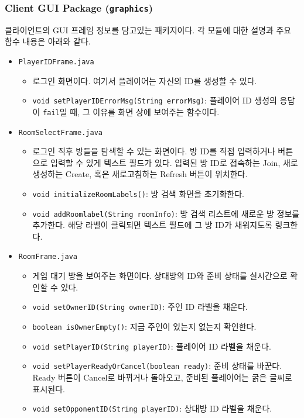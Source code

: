 \documentclass[a4paper, 10pt]{article}
\begin{document}
\subsubsection{Client GUI Package (\texttt{graphics})}
클라이언트의 GUI 프레임 정보를 담고있는 패키지이다. 각 모듈에 대한 설명과 주요
함수 내용은 아래와 같다.
\begin{itemize}
  \item \texttt{PlayerIDFrame.java}
  \begin{itemize}
    \item[] 로그인 화면이다. 여기서 플레이어는 자신의 ID를 생성할 수 있다.
    \item \texttt{void setPlayerIDErrorMsg(String errorMsg)}: 플레이어 ID 생성의 응답이 \texttt{fail}일 때, 그 이유를
    화면 상에 보여주는 함수이다.
  \end{itemize}
  \item \texttt{RoomSelectFrame.java}
  \begin{itemize}
    \item[] 로그인 직후 방들을 탐색할 수 있는 화면이다. 방 ID를 직접 입력하거나 버튼으로 입력할 수 있게 텍스트 필드가 있다.
    입력된 방 ID로 접속하는 Join, 새로 생성하는 Create, 혹은 새로고침하는 Refresh 버튼이 위치한다. 
    \item \texttt{void initializeRoomLabels()}: 방 검색 화면을 초기화한다.
    \item \texttt{void addRoomlabel(String roomInfo)}: 방 검색 리스트에 새로운 방 정보를 추가한다.
    해당 라벨이 클릭되면 텍스트 필드에 그 방 ID가 채워지도록 링크한다.
  \end{itemize}
  \item \texttt{RoomFrame.java}
  \begin{itemize}
    \item[] 게임 대기 방을 보여주는 화면이다. 상대방의 ID와 준비 상태를 실시간으로 확인할 수 있다.
    \item \texttt{void setOwnerID(String ownerID)}: 주인 ID 라벨을 채운다.
    \item \texttt{boolean isOwnerEmpty()}: 지금 주인이 있는지 없는지 확인한다.
    \item \texttt{void setPlayerID(String playerID)}: 플레이어 ID 라벨을 채운다.
    \item \texttt{void setPlayerReadyOrCancel(boolean ready)}: 준비 상태를 바꾼다. Ready 버튼이 Cancel로 바뀌거나 돌아오고,
    준비된 플레이어는 굵은 글씨로 표시된다.
    \item \texttt{void setOpponentID(String playerID)}: 상대방 ID 라벨을 채운다.

\end{itemize}
\end{itemize}
\end{document}
